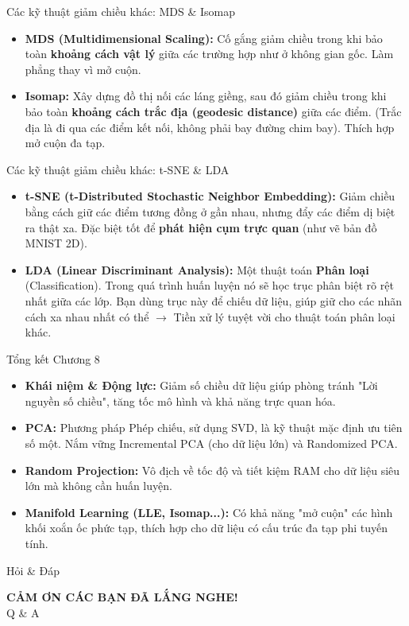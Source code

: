 \documentclass[aspectratio=169]{beamer}
\begin{document}
\begin{frame}{Các kỹ thuật giảm chiều khác: MDS \& Isomap}
    \begin{itemize}
        \item \textbf{MDS (Multidimensional Scaling):} Cố gắng giảm chiều trong khi bảo toàn \textbf{khoảng cách vật lý} giữa các trường hợp như ở không gian gốc. Làm phẳng thay vì mở cuộn.
        \item \textbf{Isomap:} Xây dựng đồ thị nối các láng giềng, sau đó giảm chiều trong khi bảo toàn \textbf{khoảng cách trắc địa (geodesic distance)} giữa các điểm. (Trắc địa là đi qua các điểm kết nối, không phải bay đường chim bay). Thích hợp mở cuộn đa tạp.
    \end{itemize}
\end{frame}

\begin{frame}{Các kỹ thuật giảm chiều khác: t-SNE \& LDA}
    \begin{itemize}
        \item \textbf{t-SNE (t-Distributed Stochastic Neighbor Embedding):} Giảm chiều bằng cách giữ các điểm tương đồng ở gần nhau, nhưng đẩy các điểm dị biệt ra thật xa. Đặc biệt tốt để \textbf{phát hiện cụm trực quan} (như vẽ bản đồ MNIST 2D).
        \item \textbf{LDA (Linear Discriminant Analysis):} Một thuật toán \textbf{Phân loại} (Classification). Trong quá trình huấn luyện nó sẽ học trục phân biệt rõ rệt nhất giữa các lớp. Bạn dùng trục này để chiếu dữ liệu, giúp giữ cho các nhãn cách xa nhau nhất có thể $\rightarrow$ Tiền xử lý tuyệt vời cho thuật toán phân loại khác.
    \end{itemize}
\end{frame}

\begin{frame}{Tổng kết Chương 8}
    \begin{itemize}
        \item \textbf{Khái niệm \& Động lực:} Giảm số chiều dữ liệu giúp phòng tránh "Lời nguyền số chiều", tăng tốc mô hình và khả năng trực quan hóa.
        \item \textbf{PCA:} Phương pháp Phép chiếu, sử dụng SVD, là kỹ thuật mặc định ưu tiên số một. Nắm vững Incremental PCA (cho dữ liệu lớn) và Randomized PCA.
        \item \textbf{Random Projection:} Vô địch về tốc độ và tiết kiệm RAM cho dữ liệu siêu lớn mà không cần huấn luyện.
        \item \textbf{Manifold Learning (LLE, Isomap...):} Có khả năng "mở cuộn" các hình khối xoắn ốc phức tạp, thích hợp cho dữ liệu có cấu trúc đa tạp phi tuyến tính.
    \end{itemize}
\end{frame}

\begin{frame}{Hỏi \& Đáp}
    \begin{center}
        \Large{\textbf{CẢM ƠN CÁC BẠN ĐÃ LẮNG NGHE!}}\\
        \vspace{1cm}
        Q \& A
    \end{center}
\end{frame}
\end{document}
